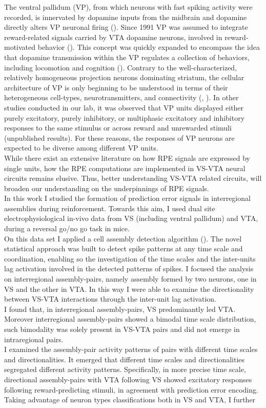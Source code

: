 The ventral pallidum (VP), from which neurons with fast spiking activity were recorded, is innervated by dopamine inputs from the midbrain and dopamine directly alters VP neuronal firing (\cite{Napier89}). Since 1991 VP was assumed to integrate reward-related signals carried by VTA dopamine neurons, involved in reward-motivated behavior (\cite{Napier91}). This concept was quickly expanded to encompass the idea that dopamine transmission within the VP regulates a collection of behaviors, including locomotion and cognition (\cite{Napier92}). Contrary to the well-characterized, relatively homogeneous projection neurons dominating striatum, the cellular architecture of VP is only beginning to be understood in terms of their heterogeneous cell-types, neurotransmitters, and connectivity (\cite{Heimer1997}, \cite{Tachibana2012}). In other studies conducted in our lab, it was observed that VP units displayed either purely excitatory, purely inhibitory, or multiphasic excitatory and inhibitory responses to the same stimulus or across reward and unrewarded stimuli (unpublished results). For these reasons, the responses of VP neurons are expected to be diverse among different VP units.\\While there exist an extensive literature on how RPE signals are expressed by single units, how the RPE computations are implemented in VS-VTA neural circuits remains elusive. Thus, better understanding VS-VTA related circuits, will broaden our understanding on the underpinnings of RPE signals.\\In this work I studied the formation of prediction error signals in interregional assemblies during reinforcement. Towards this aim, I used dual site electrophysiological in-vivo data from VS (including ventral pallidum) and VTA, during a reversal go/no go task in mice.\\On this data set I applied a cell assembly detection algorithm (\cite{RussoDurstewitz}). The novel statistical approach was built to detect spike patterns at any time scale and coordination, enabling so the investigation of the time scales and the inter-units lag activation involved in the detected patterns of spikes. I focused the analysis on interregional assembly-pairs, namely assembly formed by two neurons, one in VS and the other in VTA. In this way I were able to examine the directionality between VS-VTA interactions through the inter-unit lag activation.\\I found that, in interregional assembly-pairs, VS predominantly led VTA. Moreover interregional assembly-pairs showed a bimodal time scale distribution, such bimodality was solely present in VS-VTA pairs and did not emerge in intraregional pairs.\\I examined the assembly-pair activity patterns of pairs with different time scales and directionalities. It emerged that different time scales and directionalities segregated different activity patterns. Specifically, in more precise time scale, directional assembly-pairs with VTA following VS showed excitatory responses following reward-predicting stimuli, in agreement with prediction error encoding.\\Taking advantage of neuron types classifications both in VS and VTA, I further 